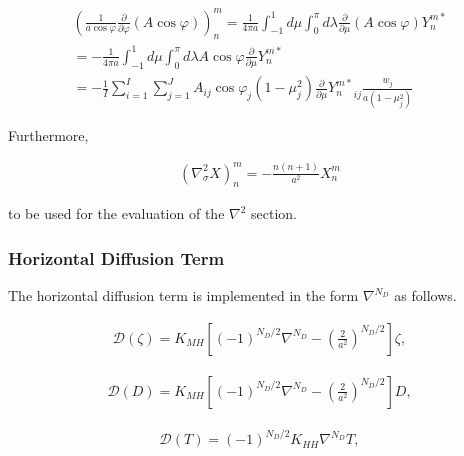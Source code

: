 \begin{eqnarray}
  \left( \frac{1}{a\cos\varphi}
         \frac{\partial{}}{\partial {\varphi}} (A\cos\varphi) \right)_n^m
    =  \frac{1}{4 \pi a}
         \int_{-1}^{1} d \mu \int_{0}^{\pi} d \lambda
           \frac{\partial{}}{\partial {\mu}} (A\cos\varphi) Y_n^{m *}  \\
    =  - \frac{1}{4 \pi a}
         \int_{-1}^{1} d \mu \int_{0}^{\pi} d \lambda
           A \cos\varphi \frac{\partial }{\partial \mu} Y_n^{m *}
            \\
   =  - \frac{1}{I} \sum_{i=1}^{I} \sum_{j=1}^{J}  
          A_{ij}  \cos\varphi_j
          (1-\mu_j^2)  \frac{\partial }{\partial \mu}
          {Y_n^{m *}}_{ij} \frac{w_j}{a(1-\mu_j^{2})}
\end{eqnarray}

Furthermore,

\begin{eqnarray}
     \left( \nabla^{2}_{\sigma} X \right)_n^m
       =  - \frac{n(n+1)}{a^{2}} X_n^m
\end{eqnarray}

to be used for the evaluation of the \(\nabla^2\) section.

\hypertarget{horizontal-diffusion-term}{%
\subsubsection{Horizontal Diffusion Term}\label{horizontal-diffusion-term}}

The horizontal diffusion term is implemented in the form \(\nabla^{N_D}\) as follows.

\begin{eqnarray}
  {\mathcal D}(\zeta) = K_{MH}
                      \left[ (-1)^{N_D/2} \nabla^{N_D}
                              - \left( \frac{2}{a^2} \right)^{N_D/2}
                      \right]
                    \zeta ,
\end{eqnarray}

\begin{eqnarray}
     {\mathcal D}(D) = K_{MH}
                      \left[ (-1)^{N_D/2} \nabla^{N_D}
                              - \left( \frac{2}{a^2} \right)^{N_D/2}
                      \right]
                    D ,
\end{eqnarray}

\begin{eqnarray}
    {\mathcal D}(T) = (-1)^{N_D/2} K_{HH} \nabla^{N_D} T ,
\end{eqnarray}

